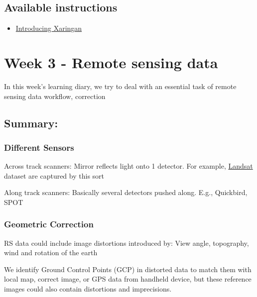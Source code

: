 \documentclass[
  letterpaper,
  DIV=11,
  numbers=noendperiod]{scrreprt}
\providecommand{\tightlist}{%
  \setlength{\itemsep}{0pt}\setlength{\parskip}{0pt}}\usepackage{longtable,booktabs,array}
\begin{document}
\hypertarget{available-instructions}{%
\section{Available instructions}\label{available-instructions}}

\begin{itemize}
\tightlist
\item
  \href{https://andrewmaclachlan.github.io/CASA0023/2_portfolio.html}{Introducing
  Xaringan}
\end{itemize}


\hypertarget{week-3---remote-sensing-data}{%
\chapter{Week 3 - Remote sensing
data}\label{week-3---remote-sensing-data}}

In this week's learning diary, we try to deal with an essential task of
remote sensing data workflow, correction

\hypertarget{summary-1}{%
\section{Summary:}\label{summary-1}}

\hypertarget{different-sensors}{%
\subsection{Different Sensors}\label{different-sensors}}

Across track scanners: Mirror reflects light onto 1 detector. For
example, \uline{Landsat} dataset are captured by this sort

Along track scanners: Basically several detectors pushed along. E.g.,
Quickbird, SPOT

\hypertarget{geometric-correction}{%
\subsection{Geometric Correction}\label{geometric-correction}}

RS data could include image distortions introduced by: View angle,
topography, wind and rotation of the earth

We identify Ground Control Points (GCP) in distorted data to match them
with local map, correct image, or GPS data from handheld device, but
these reference images could also contain distortions and imprecisions.
\end{document}
